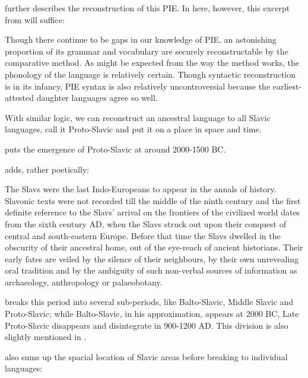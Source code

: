 \cite{oxfordintro} further describes the reconstruction of this PIE. In here, however, this excerpt from \cite{ringe2008proto} will suffice:

\begin{quotee}Though there continue to be gaps in our knowledge of PIE, an astonishing
proportion of its grammar and vocabulary are se\-cu\-re\-ly re\-con\-struct\-a\-ble by the
comparative method. As might be expected from the way the method works,
the phonology of the lan\-guage is re\-la\-ti\-ve\-ly cer\-tain. Though syntactic reconstruction is in its infancy, PIE syntax is also relatively uncontroversial because
the earliest-attested daughter languages agree so well.\end{quotee}

With similar logic, we can reconstruct an ancestral language to all Slavic languages, call it Proto-Slavic and put it on a place in space and time.

\cite{sussex2011slavic} puts the emergence of Proto-Slavic at around 2000-1500 BC. 



\cite{schenker1993proto} adds, rather poetically:
\begin{quotee}The Slavs were the last Indo-Europeans to appear in the annals of
history. Slavonic texts were not recorded till the middle of the ninth
century and the first definite reference to the Slavs' arrival on the frontiers
of the civilized world dates from the sixth century AD, when the Slavs
struck out upon their conquest of central and south-eastern Europe. Before
that time the Slavs dwelled in the obscurity of their ancestral home, out of
the eye-reach of ancient historians. Their early fates are veiled by the
silence of their neighbours, by their own unrevealing oral tradition and by
the ambiguity of such non-verbal sources of information as archaeology,
anthropology or palaeobotany.\end{quotee}

\cite{kortlandt1982early} breaks this period into several sub-periods, like Balto-Slavic, Middle Slavic and Proto-Slavic; while Balto-Slavic, in his approximation, appears at 2000 BC, Late Proto-Slavic disappears and disintegrate in 900-1200 AD. This division is also slightly mentioned in \cite{schenker1993proto}.

\cite{sussex2011slavic} also sums up the spacial location of Slavic areas before breaking to individual languages:

